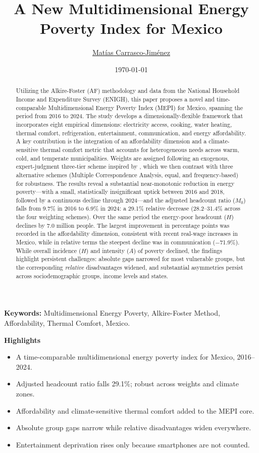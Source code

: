 \documentclass[11pt, a4paper]{article}
\title{A New Multidimensional Energy Poverty Index for Mexico}
\author[1, 2, 3]{\href{mailto:matiascarrascoj@gmail.com}{Matías Carrasco-Jiménez}}
\affil[1]{\textit{Università degli Studi Roma Tre}}
\affil[2]{\textit{Sorbonne Université}}
\affil[3]{\textit{Université de Technologie de Compiègne}}
\date{\today}
\begin{document}
\maketitle
\begin{abstract}
    \noindent Utilizing the Alkire-Foster (AF) methodology and data from the National Household Income and Expenditure Survey (ENIGH), this paper proposes a novel and time-comparable Multidimensional Energy Poverty Index (MEPI) for Mexico, spanning the period from 2016 to 2024. The study develops a dimensionally-flexible framework that incorporates eight empirical dimensions: electricity access, cooking, water heating, thermal comfort, refrigeration, entertainment, communication, and energy affordability. A key contribution is the integration of an affordability dimension and a climate-sensitive thermal comfort metric that accounts for heterogeneous needs across warm, cold, and temperate municipalities. Weights are assigned following an exogenous, expert-judgment three-tier scheme inspired by \textcite{nussbaumer2012}, which we then contrast with three alternative schemes (Multiple Correspondence Analysis, equal, and frequency-based) for robustness. The results reveal a substantial near-monotonic reduction in energy poverty---with a small, statistically insignificant uptick between 2016 and 2018, followed by a continuous decline through 2024---and the adjusted headcount ratio ($M_0$) falls from 9.7\% in 2016 to 6.9\% in 2024: a 29.1\% relative decrease (28.2--31.4\% across the four weighting schemes). Over the same period the energy-poor headcount ($H$) declines by 7.0 million people. The largest improvement in percentage points was recorded in the affordability dimension, consistent with recent real-wage increases in Mexico, while in relative terms the steepest decline was in communication ($-$71.9\%). While overall incidence ($H$) and intensity ($A$) of poverty declined, the findings highlight persistent challenges: absolute gaps narrowed for most vulnerable groups, but the corresponding \emph{relative} disadvantages widened, and substantial asymmetries persist across sociodemographic groups, income levels and states.
\end{abstract}

\noindent\textbf{Keywords:} Multidimensional Energy Poverty, Alkire-Foster Method, Affordability, Thermal Comfort, Mexico.

\vspace{0.5em}

\noindent\textbf{Highlights}
\begin{itemize}\setlength\itemsep{0pt}
    \item A time-comparable multidimensional energy poverty index for Mexico, 2016--2024.
    \item Adjusted headcount ratio falls 29.1\%; robust across weights and climate zones.
    \item Affordability and climate-sensitive thermal comfort added to the MEPI core.
    \item Absolute group gaps narrow while relative disadvantages widen everywhere.
    \item Entertainment deprivation rises only because smartphones are not counted.
\end{itemize}
\end{document}
